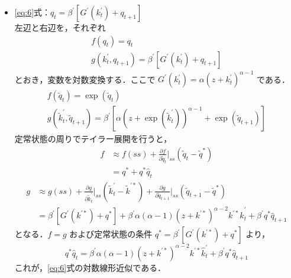 \documentclass[dvipdfmx]{jlreq}
\begin{document}
\begin{itemize}
  \item \eqref{eq:6}式：$q_t = \beta^\prime [G^\prime(k^\prime_t) + q_{t+1}]$ \\
    左辺と右辺を，それぞれ
    \begin{gather}
      f(q_t) = q_t \\
      g(k^\prime_t, q_{t+1}) = \beta^\prime [G^\prime(k^\prime_t) + q_{t+1}]
    \end{gather}
    とおき，変数を対数変換する．ここで $G^\prime(k^\prime_t) = \alpha(z+k^\prime_t)^{\alpha-1}$ である．
    \begin{gather}
      f(\widetilde{q}_t) = \exp(\widetilde{q}_t) \\
      g(\widetilde{k}^\prime_t, \widetilde{q}_{t+1}) = \beta^\prime [ \alpha(z+\exp(\widetilde{k}^\prime_t))^{\alpha-1} + \exp(\widetilde{q}_{t+1}) ]
    \end{gather}
    定常状態の周りでテイラー展開を行うと，
    \begin{equation}
      \begin{split}
        f &\approx f(ss) + \frac{\partial f}{\partial \widetilde{q}_t} \bigg|_{ss} (\widetilde{q}_t - \widetilde{q}^*) \\
        &= q^* + q^* \widehat{q}_t
      \end{split}
    \end{equation}
    \begin{equation}
      \begin{split}
        g &\approx g(ss) + \frac{\partial g}{\partial \widetilde{k}^\prime_t} \bigg|_{ss} (\widetilde{k}^\prime_t - \widetilde{k}^{\prime *}) + \frac{\partial g}{\partial \widetilde{q}_{t+1}} \bigg|_{ss} (\widetilde{q}_{t+1} - \widetilde{q}^*) \\
        &= \beta^\prime[G^\prime(k^{\prime *}) + q^*] + \beta^\prime \alpha(\alpha-1)(z+k^{\prime *})^{\alpha-2} k^{\prime *} \widehat{k}^\prime_t + \beta^\prime q^* \widehat{q}_{t+1}
      \end{split}
    \end{equation}
    となる．$f=g$ および定常状態の条件 $q^* = \beta^\prime[G^\prime(k^{\prime *}) + q^*]$ より，
    \begin{equation}
      q^* \widehat{q}_t = \beta^\prime \alpha(\alpha-1)(z+k^{\prime *})^{\alpha-2} k^{\prime *} \widehat{k}^\prime_t + \beta^\prime q^* \widehat{q}_{t+1}
    \end{equation}
    これが，\eqref{eq:6}式の対数線形近似である．


\end{itemize}
\end{document}
